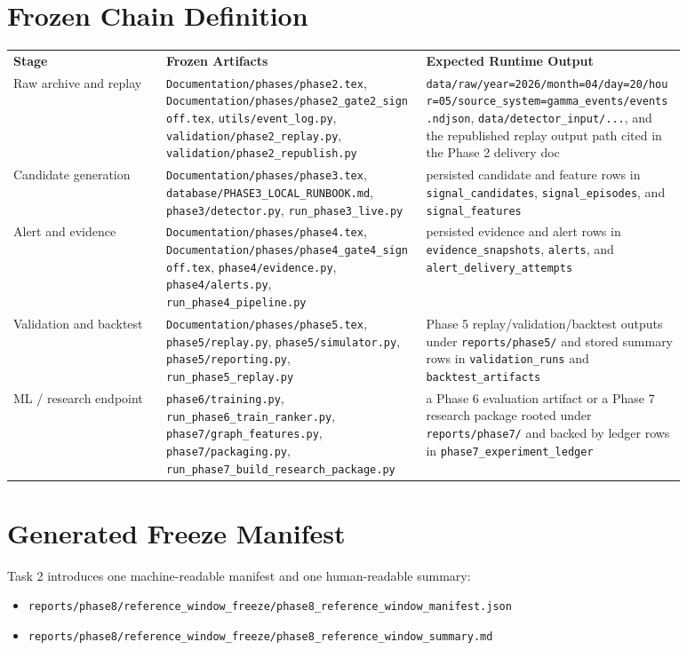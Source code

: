 \documentclass{article}
\begin{document}
\section*{Frozen Chain Definition}
\begin{longtable}{p{0.20\linewidth}p{0.34\linewidth}p{0.34\linewidth}}
\textbf{Stage} & \textbf{Frozen Artifacts} & \textbf{Expected Runtime Output} \\
Raw archive and replay & \texttt{Documentation/phases/phase2.tex}, \texttt{Documentation/phases/phase2\_gate2\_signoff.tex}, \texttt{utils/event\_log.py}, \texttt{validation/phase2\_replay.py}, \texttt{validation/phase2\_republish.py} & \texttt{data/raw/year=2026/month=04/day=20/hour=05/source\_system=gamma\_events/events.ndjson}, \texttt{data/detector\_input/...}, and the republished replay output path cited in the Phase 2 delivery doc \\
Candidate generation & \texttt{Documentation/phases/phase3.tex}, \texttt{database/PHASE3\_LOCAL\_RUNBOOK.md}, \texttt{phase3/detector.py}, \texttt{run\_phase3\_live.py} & persisted candidate and feature rows in \texttt{signal\_candidates}, \texttt{signal\_episodes}, and \texttt{signal\_features} \\
Alert and evidence & \texttt{Documentation/phases/phase4.tex}, \texttt{Documentation/phases/phase4\_gate4\_signoff.tex}, \texttt{phase4/evidence.py}, \texttt{phase4/alerts.py}, \texttt{run\_phase4\_pipeline.py} & persisted evidence and alert rows in \texttt{evidence\_snapshots}, \texttt{alerts}, and \texttt{alert\_delivery\_attempts} \\
Validation and backtest & \texttt{Documentation/phases/phase5.tex}, \texttt{phase5/replay.py}, \texttt{phase5/simulator.py}, \texttt{phase5/reporting.py}, \texttt{run\_phase5\_replay.py} & Phase 5 replay/validation/backtest outputs under \texttt{reports/phase5/} and stored summary rows in \texttt{validation\_runs} and \texttt{backtest\_artifacts} \\
ML / research endpoint & \texttt{phase6/training.py}, \texttt{run\_phase6\_train\_ranker.py}, \texttt{phase7/graph\_features.py}, \texttt{phase7/packaging.py}, \texttt{run\_phase7\_build\_research\_package.py} & a Phase 6 evaluation artifact or a Phase 7 research package rooted under \texttt{reports/phase7/} and backed by ledger rows in \texttt{phase7\_experiment\_ledger} \\
\end{longtable}

\section*{Generated Freeze Manifest}
Task 2 introduces one machine-readable manifest and one human-readable summary:
\begin{itemize}
\item \texttt{reports/phase8/reference\_window\_freeze/phase8\_reference\_window\_manifest.json}
\item \texttt{reports/phase8/reference\_window\_freeze/phase8\_reference\_window\_summary.md}
\end{itemize}
\end{document}
